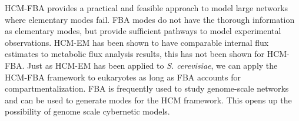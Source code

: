 \documentclass[10pt,twocolumn,twoside,final]{IEEEtran}
\begin{document}
HCM-FBA provides a practical and feasible approach to model large networks where elementary modes fail.
FBA modes do not have the thorough information as elementary modes, but provide sufficient pathways to model experimental observations.
HCM-EM has been shown to have comparable internal flux estimates to metabolic flux analysis results\cite{2008_kim_varner_ramkrishna_BiotechProg}, this has not been shown for HCM-FBA.
Just as HCM-EM has been applied to \textit{S. cerevisiae}, we can apply the HCM-FBA framework to eukaryotes as long as FBA accounts for compartmentalization.
FBA is frequently used to study genome-scale networks\cite{2010_orth_NatBiotech} and can be used to generate modes for the HCM framework.
This opens up the possibility of genome scale cybernetic models.

\end{document}
